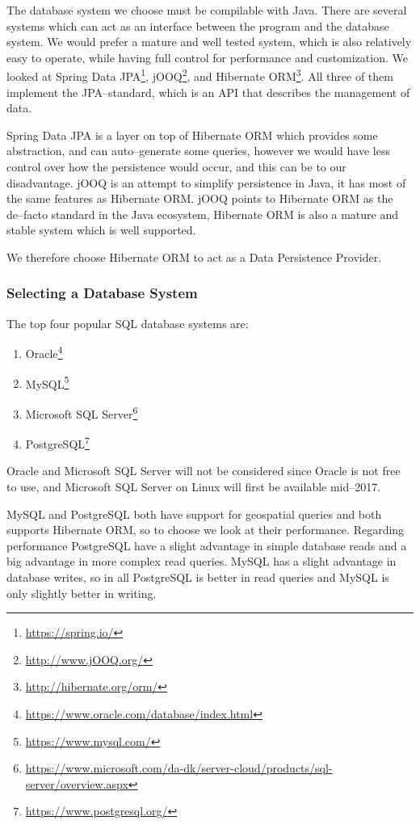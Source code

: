 The database system we choose must be compilable with Java.
There are several systems which can act as an interface between the program and the database system.
We would prefer a mature and well tested system, which is also relatively easy to operate, while having full control for performance and customization.
We looked at Spring Data JPA\footnote{\url{https://spring.io/}}, jOOQ\footnote{\url{http://www.jOOQ.org/}}, and Hibernate ORM\footnote{\url{http://hibernate.org/orm/}}.
All three of them implement the \ac{JPA}--standard\cite{JavaPersistenceAPI}, which is an \ac{API} that describes the management of data. 

Spring Data JPA is a layer on top of Hibernate ORM which provides some abstraction, and can auto--generate some queries, however we would have less control over how the persistence would occur, and this can be to our disadvantage.
jOOQ is an attempt to simplify persistence in Java, it has most of the same features as Hibernate ORM.
jOOQ points to Hibernate ORM as the de--facto standard in the Java ecosystem\cite{JOOQvsHIBERNATE},
Hibernate ORM is also a mature and stable system which is well supported. 

We therefore choose Hibernate ORM to act as a Data Persistence Provider. 

\subsubsection*{Selecting a Database System}

The top four popular SQL database systems are\cite{DB_RANKINGS}: 
\begin{enumerate}
\item Oracle\footnote{\url{https://www.oracle.com/database/index.html}}
\item MySQL\footnote{\url{https://www.mysql.com/}}
\item Microsoft SQL Server\footnote{\url{https://www.microsoft.com/da-dk/server-cloud/products/sql-server/overview.aspx}}
\item PostgreSQL\footnote{\url{https://www.postgresql.org/}}
\end{enumerate}

Oracle and Microsoft SQL Server will not be considered since Oracle is not free to use\cite{oracle_pricing}, 
and Microsoft SQL Server on Linux will first be available mid--2017\cite{ms_sql_linux}.

MySQL and PostgreSQL both have support for geospatial queries and both supports Hibernate ORM\cite{hibernate_support}, so to choose we look at their performance.
Regarding performance PostgreSQL have a slight advantage in simple database reads and a big advantage in more complex read queries.
MySQL has a slight advantage in database writes, 
so in all PostgreSQL is better in read queries and MySQL is only slightly better in writing.\cite{post_vs_mysql}

